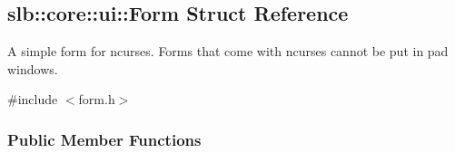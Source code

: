 \hypertarget{structslb_1_1core_1_1ui_1_1Form}{}\subsection{slb\+:\+:core\+:\+:ui\+:\+:Form Struct Reference}
\label{structslb_1_1core_1_1ui_1_1Form}


A simple form for ncurses. Forms that come with {\ttfamily ncurses} cannot be put in pad windows.  




{\ttfamily \#include $<$form.\+h$>$}

\subsubsection*{Public Member Functions}
